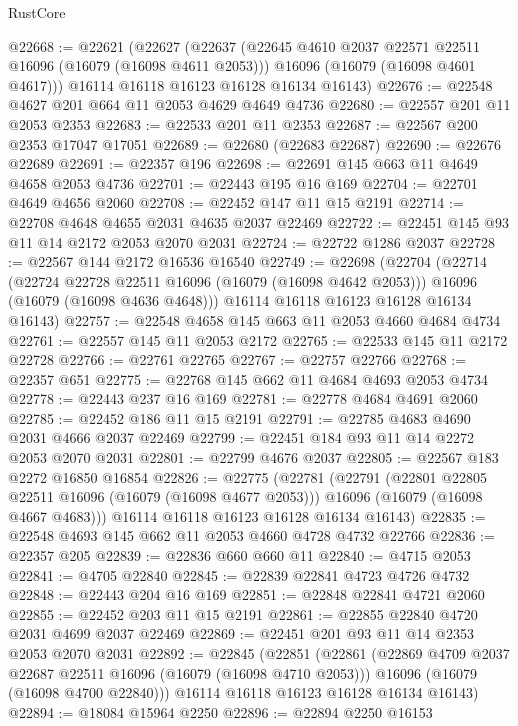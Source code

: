 \begin{lexlean}{RustCore}
\begin{coremodule}
@22668 := @22621
    (@22627
      (@22637
        (@22645 @4610 @2037 @22571 @22511 @16096 (@16079 (@16098 @4611 @2053)))
        @16096
        (@16079 (@16098 @4601 @4617)))
      @16114
      @16118
      @16123
      @16128
      @16134
      @16143)
@22676 := @22548 @4627 @201 @664 @11 @2053 @4629 @4649 @4736
@22680 := @22557 @201 @11 @2053 @2353
@22683 := @22533 @201 @11 @2353
@22687 := @22567 @200 @2353 @17047 @17051
@22689 := @22680 (@22683 @22687)
@22690 := @22676 @22689
@22691 := @22357 @196
@22698 := @22691 @145 @663 @11 @4649 @4658 @2053 @4736
@22701 := @22443 @195 @16 @169
@22704 := @22701 @4649 @4656 @2060
@22708 := @22452 @147 @11 @15 @2191
@22714 := @22708 @4648 @4655 @2031 @4635 @2037 @22469
@22722 := @22451 @145 @93 @11 @14 @2172 @2053 @2070 @2031
@22724 := @22722 @1286 @2037
@22728 := @22567 @144 @2172 @16536 @16540
@22749 := @22698
    (@22704
      (@22714
        (@22724 @22728 @22511 @16096 (@16079 (@16098 @4642 @2053)))
        @16096
        (@16079 (@16098 @4636 @4648)))
      @16114
      @16118
      @16123
      @16128
      @16134
      @16143)
@22757 := @22548 @4658 @145 @663 @11 @2053 @4660 @4684 @4734
@22761 := @22557 @145 @11 @2053 @2172
@22765 := @22533 @145 @11 @2172 @22728
@22766 := @22761 @22765
@22767 := @22757 @22766
@22768 := @22357 @651
@22775 := @22768 @145 @662 @11 @4684 @4693 @2053 @4734
@22778 := @22443 @237 @16 @169
@22781 := @22778 @4684 @4691 @2060
@22785 := @22452 @186 @11 @15 @2191
@22791 := @22785 @4683 @4690 @2031 @4666 @2037 @22469
@22799 := @22451 @184 @93 @11 @14 @2272 @2053 @2070 @2031
@22801 := @22799 @4676 @2037
@22805 := @22567 @183 @2272 @16850 @16854
@22826 := @22775
    (@22781
      (@22791
        (@22801 @22805 @22511 @16096 (@16079 (@16098 @4677 @2053)))
        @16096
        (@16079 (@16098 @4667 @4683)))
      @16114
      @16118
      @16123
      @16128
      @16134
      @16143)
@22835 := @22548 @4693 @145 @662 @11 @2053 @4660 @4728 @4732 @22766
@22836 := @22357 @205
@22839 := @22836 @660 @660 @11
@22840 := @4715 @2053
@22841 := @4705 @22840
@22845 := @22839 @22841 @4723 @4726 @4732
@22848 := @22443 @204 @16 @169
@22851 := @22848 @22841 @4721 @2060
@22855 := @22452 @203 @11 @15 @2191
@22861 := @22855 @22840 @4720 @2031 @4699 @2037 @22469
@22869 := @22451 @201 @93 @11 @14 @2353 @2053 @2070 @2031
@22892 := @22845
    (@22851
      (@22861
        (@22869 @4709 @2037 @22687 @22511 @16096 (@16079 (@16098 @4710 @2053)))
        @16096
        (@16079 (@16098 @4700 @22840)))
      @16114
      @16118
      @16123
      @16128
      @16134
      @16143)
@22894 := @18084 @15964 @2250
@22896 := @22894 @2250 @16153

\end{coremodule}
\end{lexlean}
